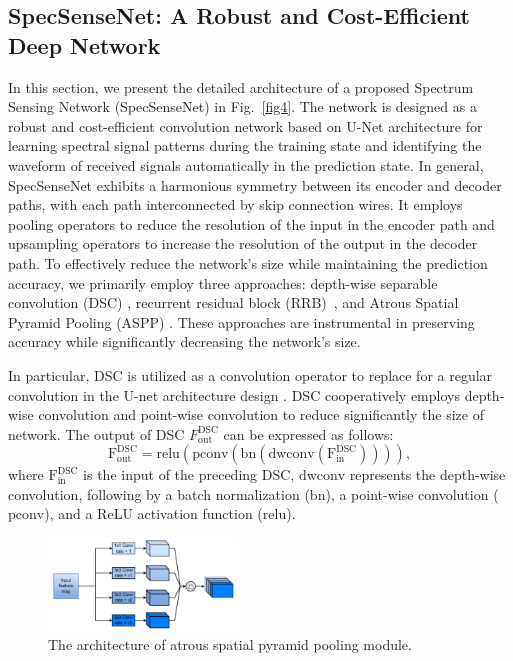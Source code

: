 \documentclass[conference]{IEEEtran} %
\begin{document}
\subsection{SpecSenseNet: A Robust and Cost-Efficient Deep Network}
In this section, we present the detailed architecture of a proposed Spectrum Sensing Network (SpecSenseNet) in Fig.~\ref{fig4}. The network is designed as a robust and cost-efficient convolution network based on U-Net architecture \cite{ronneberger2015u} for learning spectral signal patterns during the training state and identifying the waveform of received signals automatically in the prediction state. In general, SpecSenseNet exhibits a harmonious symmetry between its encoder and decoder paths, with each path interconnected by skip connection wires. It employs pooling operators to reduce the resolution of the input in the encoder path and upsampling operators to increase the resolution of the output in the decoder path. To effectively reduce the network's size while maintaining the prediction accuracy, we primarily employ three approaches: depth-wise separable convolution (DSC) \cite{CholletXception}, recurrent residual block (RRB)~\cite{aghalari2021brain, he2016deep}, and Atrous Spatial Pyramid Pooling (ASPP) \cite{ChenAtrous}. These approaches are instrumental in preserving accuracy while significantly decreasing the network's size. 

In particular, DSC \cite{CholletXception} is utilized as a convolution operator to replace for a regular convolution in the U-net architecture design \cite{ronneberger2015u}. DSC cooperatively employs depth-wise convolution and point-wise convolution to reduce significantly the size of network. The output of DSC $F_\text{out}^\text{DSC}$ can be expressed as follows:
\begin{equation}
    \mathrm{F}_\text{out}^\text{DSC} = \mathrm{relu}(\mathrm{pconv}(\mathrm{bn}(\mathrm{dwconv}(\mathrm{F}_\text{in}^\text{DSC})))),
    \label{eq:Fdsc}
\end{equation}
where $\mathrm{F}_\text{in}^\text{DSC}$ is the input of the preceding DSC, $\mathrm{dwconv}$ represents the depth-wise convolution, following by a batch normalization ($\mathrm{bn}$), a point-wise convolution ($\mathrm{pconv}$), and a ReLU activation function ($\mathrm{relu}$).

\begin{figure}[!t]
    \centering
    \includegraphics[width=0.45\textwidth]{img/Design-ASPP_modify.pdf}
    \caption{The architecture of atrous spatial pyramid pooling module.}
    \label{fig3}
\end{figure}
\end{document}
